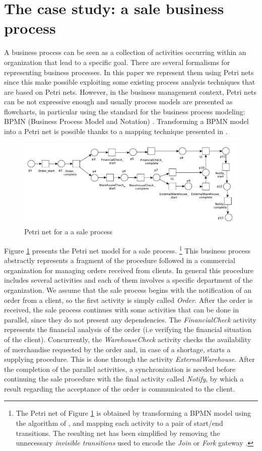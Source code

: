 \documentclass{llncs}
\begin{document}
\section{The case study: a sale business process}\label{example}
A business process can be seen as a collection of activities occurring within an organization that lead to a specific goal. There are several formalisms for representing business processes. In this paper we represent them using Petri nets \cite{8}\cite{10} since this make possible exploiting some existing process analysis techniques that are based on Petri nets. However, in the business management context, Petri nets can be not expressive enough and usually process models are presented as flowcharts, in particular using the standard for the business process modeling: BPMN (Business Process Model and Notation) \cite{9}. Transforming a BPMN model into a Petri net is possible thanks to a mapping technique presented in \cite{12}\cite{2}.
\begin{figure}[h]
\includegraphics[width=360pt]
{./items/Sales_PN.pdf}
\caption{Petri net for a a sale process}
\label{pnet}
\end{figure}

Figure \ref{pnet} presents the Petri net model for a sale
process.
\footnote{
The Petri net of Figure \ref{pnet} is obtained by
transforming a BPMN model using the algorithm of \cite{2}, and mapping
each activity to a pair of start/end transitions. The resulting net
has been simplified by removing the unnecessary \emph{invisible
  transitions} used to encode the \emph{Join} or \emph{Fork} gateway \cite{2}.
}
This business process abstractly represents a fragment of the
procedure followed in a commercial organization for managing orders
received from clients. In general this procedure includes several
activities and each of them involves a specific department of the
organization. We assume that the sale process begins with the
notification of an order from a client, so the first activity is
simply called \emph{Order}. After the order is received, the sale
process continues with some activities that can be done in parallel,
since they do not present any dependencies. The \emph{FinancialCheck}
activity represents the financial analysis of the order  (i.e
verifying the financial situation of the client). Concurrently, the
\emph{WarehouseCheck} activity checks the availability of merchandise
requested by the order and, in case of a shortage, starts a supplying procedure. This is done through the activity \emph{ExternalWarehouse}. After the completion of the  parallel activities, a synchronization is needed before continuing the sale procedure with the final activity called \emph{Notify}, by which a result regarding the acceptance of the order is communicated to the client.
\end{document}
